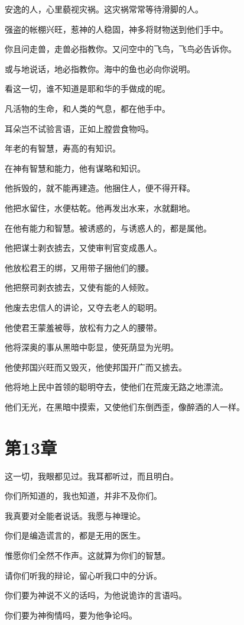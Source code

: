 \documentclass[12pt,oneside]{book}
\begin{document}
安逸的人，心里藐视灾祸。这灾祸常常等待滑脚的人。

强盗的帐棚兴旺，惹神的人稳固，神多将财物送到他们手中。

你且问走兽，走兽必指教你。又问空中的飞鸟，飞鸟必告诉你。

或与地说话，地必指教你。海中的鱼也必向你说明。

看这一切，谁不知道是耶和华的手做成的呢。

凡活物的生命，和人类的气息，都在他手中。

耳朵岂不试验言语，正如上膛尝食物吗。

年老的有智慧，寿高的有知识。

在神有智慧和能力，他有谋略和知识。

他拆毁的，就不能再建造。他捆住人，便不得开释。

他把水留住，水便枯乾。他再发出水来，水就翻地。

在他有能力和智慧。被诱惑的，与诱惑人的，都是属他。

他把谋士剥衣掳去，又使审判官变成愚人。

他放松君王的绑，又用带子捆他们的腰。

他把祭司剥衣掳去，又使有能的人倾败。

他废去忠信人的讲论，又夺去老人的聪明。

他使君王蒙羞被辱，放松有力之人的腰带。

他将深奥的事从黑暗中彰显，使死荫显为光明。

他使邦国兴旺而又毁灭，他使邦国开广而又掳去。

他将地上民中首领的聪明夺去，使他们在荒废无路之地漂流。

他们无光，在黑暗中摸索，又使他们东倒西歪，像醉酒的人一样。



\chapter{第13章}
这一切，我眼都见过。我耳都听过，而且明白。

你们所知道的，我也知道，并非不及你们。

我真要对全能者说话。我愿与神理论。

你们是编造谎言的，都是无用的医生。

惟愿你们全然不作声。这就算为你们的智慧。

请你们听我的辩论，留心听我口中的分诉。

你们要为神说不义的话吗，为他说诡诈的言语吗。

你们要为神徇情吗，要为他争论吗。
\end{document}
